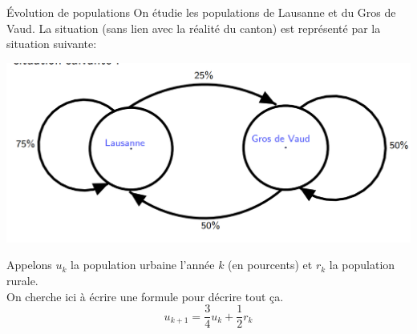 \begin{parag}{Évolution de populations}
    On étudie les populations de Lausanne et du Gros de Vaud. La situation (sans lien avec la réalité du canton) est représenté par la situation suivante:
    \begin{center}
        \includegraphics[scale=0.4]{Algèbre linéaire/Screenshot 2024-11-28 081103.png}
    \end{center}
    Appelons $u_k$ la population urbaine l'année $k$ (en pourcents) et $r_k$ la population rurale.
    \\ 
    On cherche ici à écrire une formule pour décrire tout ça.\\
    \[u_{k+1} = \frac{3}{4}u_k + \frac{1}{2}r_k\]
    

\end{parag}
